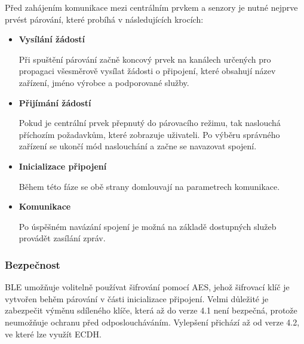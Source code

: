   Před zahájením komunikace mezi centrálním prvkem a senzory je nutné nejprve prvést párování, 
  které probíhá v následujících krocích:
  \begin{itemize}
   \item \textbf{Vysílání žádostí}
   
   Při spuštění párování začně koncový prvek na kanálech určených pro propagaci všesměrově vysílat žádosti o připojení,
   které obsahují název zařízení, jméno výrobce a podporované služby.
   
   \item \textbf{Přijímání žádostí}
   
   Pokud je centrální prvek přepnutý do párovacího režimu, tak naslouchá příchozím požadavkům, které zobrazuje uživateli.
   Po výběru správného zařízení se ukončí mód naslouchání a začne se navazovat spojení.
   
   \item \textbf{Inicializace připojení} 
   
   Během této fáze se obě strany domlouvají na parametrech komunikace.
   \item \textbf{Komunikace}
   
   Po úspěšném navázání spojení je možná na základě dostupných služeb provádět zasílání zpráv.
  \end{itemize}

 
   \subsubsection{Bezpečnost}
   BLE umožňuje volitelně používat šifrování pomocí AES, jehož šifrovací klíč je 
   vytvořen behěm párování v části inicializace připojení. Velmi důležité je zabezpečit 
   výměnu sdíleného klíče, která až do verze 4.1 není bezpečná, protože neumožňuje ochranu
   před odposloucháváním. Vylepšení přichází až od verze 4.2, ve které lze využít ECDH.
   
